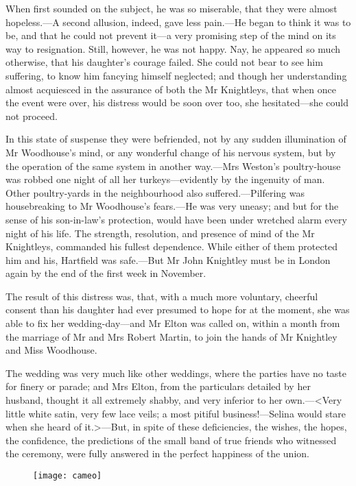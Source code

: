 When first sounded on the subject, he was so miserable, that they were almost hopeless.—A second allusion, indeed, gave less pain.—He began to think it was to be, and that he could not prevent it—a very promising step of the mind on its way to resignation. Still, however, he was not happy. Nay, he appeared so much otherwise, that his daughter's courage failed. She could not bear to see him suffering, to know him fancying himself neglected; and though her understanding almost acquiesced in the assurance of both the Mr Knightleys, that when once the event were over, his distress would be soon over too, she hesitated—she could not proceed.

In this state of suspense they were befriended, not by any sudden illumination of Mr Woodhouse's mind, or any wonderful change of his nervous system, but by the operation of the same system in another way.—Mrs Weston's poultry-house was robbed one night of all her turkeys—evidently by the ingenuity of man. Other poultry-yards in the neighbourhood also suffered.—Pilfering was housebreaking to Mr Woodhouse's fears.—He was very uneasy; and but for the sense of his son-in-law's protection, would have been under wretched alarm every night of his life. The strength, resolution, and presence of mind of the Mr Knightleys, commanded his fullest dependence. While either of them protected him and his, Hartfield was safe.—But Mr John Knightley must be in London again by the end of the first week in November.

The result of this distress was, that, with a much more voluntary, cheerful consent than his daughter had ever presumed to hope for at the moment, she was able to fix her wedding-day—and Mr Elton was called on, within a month from the marriage of Mr and Mrs Robert Martin, to join the hands of Mr Knightley and Miss Woodhouse.

The wedding was very much like other weddings, where the parties have no taste for finery or parade; and Mrs Elton, from the particulars detailed by her husband, thought it all extremely shabby, and very inferior to her own.—<Very little white satin, very few lace veils; a most pitiful business!—Selina would stare when she heard of it.>—But, in spite of these deficiencies, the wishes, the hopes, the confidence, the predictions of the small band of true friends who witnessed the ceremony, were fully answered in the perfect happiness of the union.

\vfill
\begin{figure}[bh]
\centering
\texttt{[image: cameo]}
\end{figure}
